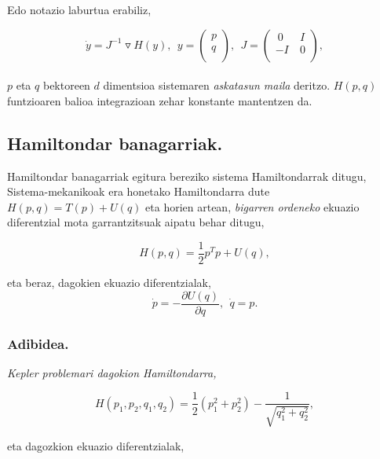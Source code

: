 Edo notazio laburtua erabiliz,

\begin{equation}
\dot{y}=J^{-1}\triangledown H(y),\ \ 
y=\left(\begin{array}{c}
  p \\
  q \\
  \end{array}\right), \ \
J=\left(\begin{array}{cc}
  \ 0 & \ I \\
   -I & \ 0 \\
\end{array}\right),  
\end{equation}

\paragraph*{}$p$ eta $q$ bektoreen $d$ dimentsioa sistemaren \emph{askatasun maila} deritzo. $H(p,q)$ funtzioaren balioa integrazioan zehar konstante mantentzen da.

\subsection*{Hamiltondar banagarriak.}

Hamiltondar banagarriak egitura bereziko sistema Hamiltondarrak ditugu, Sistema-mekanikoak era honetako Hamiltondarra dute $H(p,q)=T(p)+U(q)$ eta horien artean, \emph{bigarren ordeneko} ekuazio diferentzial mota garrantzitsuak aipatu behar ditugu,  

\begin{equation*}
H(p,q)=\frac{1}{2}p^Tp +U(q),
\end{equation*}

eta beraz, dagokien ekuazio diferentzialak,
\begin{equation*}
\dot{p}=-\frac{\partial U(q)}{\partial q}, \ \ \dot{q}=p. 
\end{equation*}

\subsubsection*{Adibidea.}
\it {Kepler problemari} dagokion Hamiltondarra,

\begin{equation}
H(p_1,p_2,q_1,q_2)=\frac{1}{2}(p_1^2+p_2^2)-\frac{1}{\sqrt{q_1^2+q_2^2}},
\end{equation}

eta dagozkion ekuazio diferentzialak,

